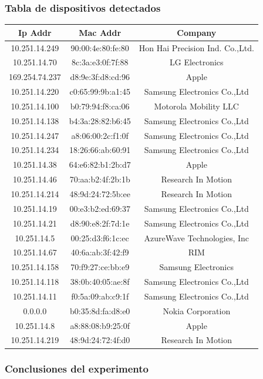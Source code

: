 \subsubsection{Tabla de dispositivos detectados}
\begin{tabular}{ |c|c|c| }
	\hline
	Ip Addr & Mac Addr & Company \\	
	\hline
	10.251.14.249 & 90:00:4e:80:fe:80 & Hon Hai Precision Ind. Co.,Ltd. \\
	\hline
	10.251.14.70 & 8c:3a:e3:0f:7f:88 & LG Electronics \\
	\hline
	169.254.74.237 & d8:9e:3f:d8:cd:96 & Apple \\
	\hline
	10.251.14.220 & c0:65:99:9b:a1:45 & Samsung Electronics Co.,Ltd \\
	\hline
	10.251.14.100 & b0:79:94:f8:ca:06 & Motorola Mobility LLC \\
	\hline
	10.251.14.138 & b4:3a:28:82:b6:45 & Samsung Electronics Co.,Ltd \\
	\hline
	10.251.14.247 & a8:06:00:2c:f1:0f & Samsung Electronics Co.,Ltd \\
	\hline
	10.251.14.234 & 18:26:66:ab:60:91 & Samsung Electronics Co.,Ltd \\
	\hline
	10.251.14.38 & 64:e6:82:b1:2b:d7 & Apple \\
	\hline
	10.251.14.46 & 70:aa:b2:4f:2b:1b & Research In Motion \\
	\hline
	10.251.14.214 & 48:9d:24:72:5b:ee & Research In Motion \\
	\hline
	10.251.14.19 & 00:e3:b2:ed:69:37 & Samsung Electronics Co.,Ltd \\
	\hline
	10.251.14.21 & d8:90:e8:2f:7d:1e & Samsung Electronics Co.,Ltd \\
	\hline
	10.251.14.5 & 00:25:d3:f6:1c:ec & AzureWave Technologies, Inc \\
	\hline
	10.251.14.67 & 40:6a:ab:3f:42:f9 & RIM \\
	\hline
	10.251.14.158 & 70:f9:27:ce:bb:e9 & Samsung Electronics \\
	\hline
	10.251.14.118 & 38:0b:40:05:ae:8f & Samsung Electronics Co.,Ltd \\
	\hline
	10.251.14.11 & f0:5a:09:ab:c9:1f & Samsung Electronics Co.,Ltd \\
	\hline
	0.0.0.0 & b0:35:8d:fa:d8:e0 & Nokia Corporation \\
	\hline
	10.251.14.8 & a8:88:08:b9:25:0f & Apple \\
	\hline
	10.251.14.219 & 48:9d:24:72:4f:d0 & Research In Motion \\
	\hline
\end{tabular}

\subsubsection{Conclusiones del experimento}